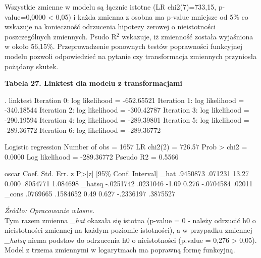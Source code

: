 Wszystkie zmienne w modelu są łącznie istotne (LR chi2(7)=733,15, p-value=0,0000 < 0,05) i każda zmienna z osobna ma p-value mniejsze od 5\% co wskazuje na konieczność odrzucenia hipotezy zerowej o nieistotności poszczególnych zmiennych. Psudo R$^{2}$ wskazuje, iż zmienność została wyjaśniona  w około 56,15\%. Przeprowadzenie ponownych testów poprawności funkcyjnej modelu pozwoli odpowiedzieć na pytanie czy transformacja zmiennych przyniosła pożądany skutek.

\vspace{0.5cm}

\textbf{Tabela 27. Linktest dla modelu z transformacjami}
\begin{stlog}
. linktest
Iteration 0:   log likelihood = -652.65521  
Iteration 1:   log likelihood = -340.18544  
Iteration 2:   log likelihood = -300.42787  
Iteration 3:   log likelihood = -290.19594  
Iteration 4:   log likelihood = -289.39801  
Iteration 5:   log likelihood = -289.36772  
Iteration 6:   log likelihood = -289.36772  

Logistic regression                               Number of obs   =       1657
                                                  LR chi2(2)      =     726.57
                                                  Prob > chi2     =     0.0000
Log likelihood = -289.36772                       Pseudo R2       =     0.5566

       oscar {\VBAR}      Coef.   Std. Err.      z    P>|z|     [95\% Conf. Interval]
        _hat {\VBAR}   .9450873    .071231    13.27   0.000     .8054771    1.084698
      _hatsq {\VBAR}  -.0251742   .0231046    -1.09   0.276    -.0704584      .02011
       _cons {\VBAR}   .0769665   .1584652     0.49   0.627    -.2336197    .3875527
 \end{stlog}
\textit{\footnotesize{Źródło: Opracowanie własne.}} \\

Tym razem zmienna \textit{_hat} okazała się istotna (p-value = 0 - należy odrzucić h0 o nieistotności zmiennej na każdym poziomie istotności), a w przypadku zmiennej \textit{_hatsq} niema podstaw do odrzucenia h0 o nieistotności (p.value = 0,276 > 0,05). Model z trzema zmiennymi w logarytmach ma poprawną formę funkcyjną. 

